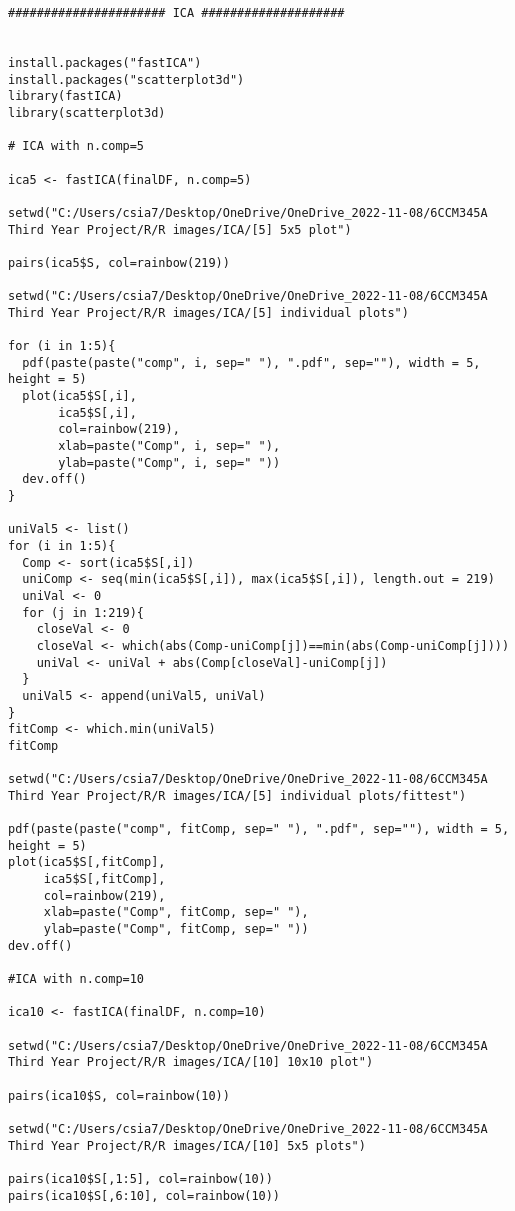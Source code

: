 \begin{verbatim}
###################### ICA ####################


install.packages("fastICA")
install.packages("scatterplot3d")
library(fastICA)
library(scatterplot3d)

# ICA with n.comp=5 

ica5 <- fastICA(finalDF, n.comp=5)

setwd("C:/Users/csia7/Desktop/OneDrive/OneDrive_2022-11-08/6CCM345A Third Year Project/R/R images/ICA/[5] 5x5 plot")

pairs(ica5$S, col=rainbow(219))

setwd("C:/Users/csia7/Desktop/OneDrive/OneDrive_2022-11-08/6CCM345A Third Year Project/R/R images/ICA/[5] individual plots")

for (i in 1:5){
  pdf(paste(paste("comp", i, sep=" "), ".pdf", sep=""), width = 5, height = 5) 
  plot(ica5$S[,i],
       ica5$S[,i], 
       col=rainbow(219), 
       xlab=paste("Comp", i, sep=" "), 
       ylab=paste("Comp", i, sep=" "))
  dev.off()
}

uniVal5 <- list()
for (i in 1:5){
  Comp <- sort(ica5$S[,i])
  uniComp <- seq(min(ica5$S[,i]), max(ica5$S[,i]), length.out = 219)
  uniVal <- 0
  for (j in 1:219){
    closeVal <- 0
    closeVal <- which(abs(Comp-uniComp[j])==min(abs(Comp-uniComp[j])))
    uniVal <- uniVal + abs(Comp[closeVal]-uniComp[j])
  }
  uniVal5 <- append(uniVal5, uniVal)
}
fitComp <- which.min(uniVal5)
fitComp

setwd("C:/Users/csia7/Desktop/OneDrive/OneDrive_2022-11-08/6CCM345A Third Year Project/R/R images/ICA/[5] individual plots/fittest")

pdf(paste(paste("comp", fitComp, sep=" "), ".pdf", sep=""), width = 5, height = 5) 
plot(ica5$S[,fitComp],
     ica5$S[,fitComp], 
     col=rainbow(219), 
     xlab=paste("Comp", fitComp, sep=" "), 
     ylab=paste("Comp", fitComp, sep=" "))
dev.off()

#ICA with n.comp=10 

ica10 <- fastICA(finalDF, n.comp=10)

setwd("C:/Users/csia7/Desktop/OneDrive/OneDrive_2022-11-08/6CCM345A Third Year Project/R/R images/ICA/[10] 10x10 plot")

pairs(ica10$S, col=rainbow(10))

setwd("C:/Users/csia7/Desktop/OneDrive/OneDrive_2022-11-08/6CCM345A Third Year Project/R/R images/ICA/[10] 5x5 plots")

pairs(ica10$S[,1:5], col=rainbow(10))
pairs(ica10$S[,6:10], col=rainbow(10))


\end{verbatim}
